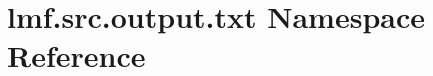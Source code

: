 \hypertarget{namespacelmf_1_1src_1_1output_1_1txt}{\section{lmf.\+src.\+output.\+txt Namespace Reference}
\label{namespacelmf_1_1src_1_1output_1_1txt}
}
